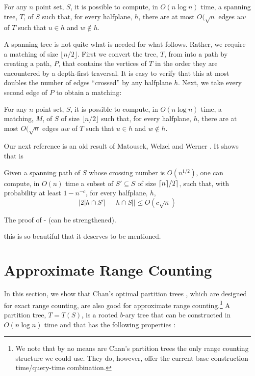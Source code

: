 \documentclass{patmorin}
\begin{document}
\begin{thm}
  For any $n$ point set, $S$, it is possible to compute, in $O(n\log n)$
  time, a spanning tree, $T$, of $S$ such that, for every halfplane, $h$,
  there are at most $O(\sqrt{n}$ edges $uw$ of $T$ such that $u\in h$
  and $w\not\in h$.
\end{thm}

A spanning tree is not quite what is needed for what follows.  Rather,
we require a matching of size $\lfloor n/2\rfloor$.  
First we convert the tree, $T$, from  into a path by creating a path, $P$, that contains the vertices of $T$ in the order they are encountered by a depth-first traversal.
It is easy to verify that this at most doubles the
number of edges ``crossed'' by any halfplane $h$. Next, we take every second edge of $P$ to obtain a matching:

\begin{cor}
  For any $n$ point set, $S$, it is possible to compute, in $O(n\log n)$
  time, a matching, $M$, of $S$ of size $\lfloor n/2\rfloor$ such that,
  for every halfplane, $h$, there are at most $O(\sqrt{n}$ edges $uw$
  of $T$ such that $u\in h$ and $w\not\in h$.
\end{cor}

Our next reference is an old result of Matousek, Welzel and Werner
\cite{mww93}.  It shows that  is 

\begin{lem}
  Given a spanning path of $S$ whose crossing number is $O(n^{1/2})$, one can compute, in $O(n)$ time a subset of $S'\subseteq S$ of size ${\lceil n \rceil}/2 \rceil$, such that, with probability at least $1-n^{-c}$, for every halfplane, $h$,
\[
    \left| 2|h\cap S'| - |h\cap S| \right| \le O(c\sqrt{n})
\]
\end{lem}

The proof of  - (can be strengthened).


this is so beautiful that it deserves to be mentioned.








\section{Approximate Range Counting}

In this section, we show that Chan's optimal partition trees \cite{c12},
which are designed for exact range counting, are also good for approximate
range counting.\footnote{We note that by no means are Chan's partition
trees the only range counting structure we could use.  They do, however,
offer the current base construction-time/query-time combination.}
A partition tree, $T=T(S)$, is a rooted $b$-ary tree that can be
constructed in $O(n\log n)$ time and that has the following properties
\cite[Theorems~3.2 and 4.2]{c12}:
\end{document}
